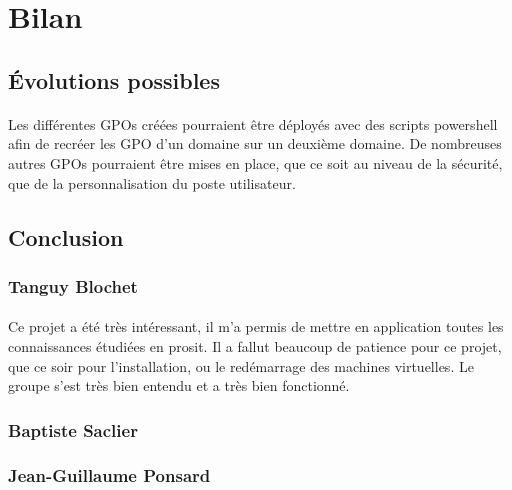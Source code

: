 \section{Bilan}
	\subsection{Évolutions possibles}
		\paragraph{}
			Les différentes GPOs créées pourraient être déployés avec des scripts powershell afin de recréer les GPO d'un domaine sur un deuxième domaine. De nombreuses autres GPOs pourraient être mises en place, que ce soit au niveau de la sécurité, que de la personnalisation du poste utilisateur.
	\subsection{Conclusion}
		\subsubsection{Tanguy Blochet}
			\paragraph{}
				Ce projet a été très intéressant, il m'a permis de mettre en application toutes les connaissances étudiées en prosit. Il a fallut beaucoup de patience pour ce projet, que ce soir pour l'installation, ou le redémarrage des machines virtuelles. Le groupe s'est très bien entendu et a très bien fonctionné.
		\subsubsection{Baptiste Saclier}
			\paragraph{}

		\subsubsection{Jean-Guillaume Ponsard}	
			\paragraph{}
